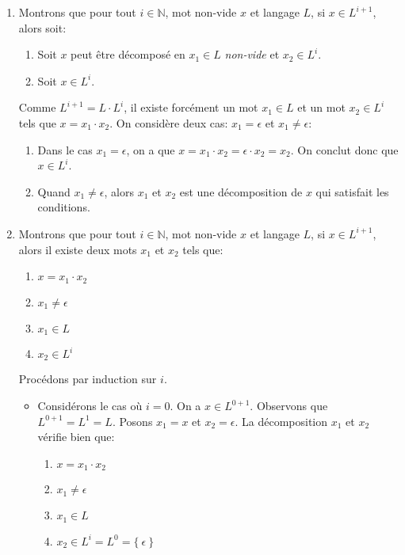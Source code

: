 \documentclass[12pt,french,a4paper]{article}
\begin{document}
\begin{question}
\begin{enumerate}
\item
Montrons que pour tout $i \in \mathbb{N}$, mot non-vide $x$ et langage $L$, si $x \in L^{i+1}$, alors soit:
\begin{enumerate}
\item
Soit $x$ peut être décomposé en $x_1 \in L$ \textit{non-vide} et $x_2 \in L^i$.
\item
Soit $x \in L^i$. 
\end{enumerate}

Comme $L^{i + 1} = L \cdot L^i$, il existe forcément un mot $x_1 \in L$ et un mot $x_2 \in L^i$ tels que $x = x_1 \cdot x_2$.
On considère deux cas: $x_1 = \epsilon$ et $x_1 \neq \epsilon$:
\begin{enumerate}
\item
Dans le cas $x_1 = \epsilon$, on a que $x = x_1 \cdot x_2 = \epsilon \cdot x_2 = x_2$.
On conclut donc que $x \in L^i$.
\item
Quand $x_1 \neq \epsilon$, alors $x_1$ et $x_2$ est une décomposition de $x$ qui satisfait les conditions.
\end{enumerate}


\item

Montrons que pour tout $i \in \mathbb{N}$, mot non-vide $x$ et langage $L$, si $x \in L^{i+1}$, alors il existe deux mots $x_1$ et $x_2$ tels que:
\begin{enumerate}
\item $x = x_1 \cdot x_2$
\item $x_1 \neq \epsilon$
\item $x_1 \in L$
\item $x_2 \in L^i$
\end{enumerate}
Procédons par induction sur $i$.
\begin{itemize}
\item Considérons le cas où $i = 0$. On a $x \in L^{0+1}$. Observons que $L^{0+1} = L^1 = L$. Posons $x_1 = x$ et $x_2 = \epsilon$. La décomposition $x_1$ et $x_2$ vérifie bien que: 
\begin{enumerate}
\item $x = x_1 \cdot x_2$
\item $x_1 \neq \epsilon$
\item $x_1 \in L$
\item $x_2 \in L^i = L^0 = \{\ \epsilon\ \}$
\end{enumerate}


\end{itemize}
\end{enumerate}
\end{question}
\end{document}
